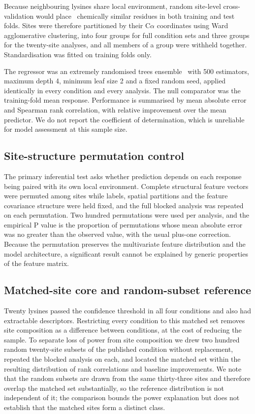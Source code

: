 \documentclass[journal=jprobs,manuscript=article,layout=traditional]{achemso}
\begin{document}
Because neighbouring lysines share local environment, random site-level cross-validation would place~\cite{roberts2017} chemically similar residues in both training and test folds. Sites were therefore partitioned by their C$\alpha$ coordinates using Ward agglomerative clustering, into four groups for full condition sets and three groups for the twenty-site analyses, and all members of a group were withheld together. Standardisation was fitted on training folds only.

The regressor was an extremely randomised trees ensemble~\cite{geurts2006} with 500 estimators, maximum depth 4, minimum leaf size 2 and a fixed random seed, applied identically in every condition and every analysis. The null comparator was the training-fold mean response. Performance is summarised by mean absolute error and Spearman rank correlation, with relative improvement over the mean predictor. We do not report the coefficient of determination, which is unreliable for model assessment at this sample size.

\subsection{Site-structure permutation control}

The primary inferential test asks whether prediction depends on each response being paired with its own local environment. Complete structural feature vectors were permuted among sites while labels, spatial partitions and the feature covariance structure were held fixed, and the full blocked analysis was repeated on each permutation. Two hundred permutations were used per analysis, and the empirical P value is the proportion of permutations whose mean absolute error was no greater than the observed value, with the usual plus-one correction. Because the permutation preserves the multivariate feature distribution and the model architecture, a significant result cannot be explained by generic properties of the feature matrix.

\subsection{Matched-site core and random-subset reference}

Twenty lysines passed the confidence threshold in all four conditions and also had extractable descriptors. Restricting every condition to this matched set removes site composition as a difference between conditions, at the cost of reducing the sample. To separate loss of power from site composition we drew two hundred random twenty-site subsets of the published condition without replacement, repeated the blocked analysis on each, and located the matched set within the resulting distribution of rank correlations and baseline improvements. We note that the random subsets are drawn from the same thirty-three sites and therefore overlap the matched set substantially, so the reference distribution is not independent of it; the comparison bounds the power explanation but does not establish that the matched sites form a distinct class.
\end{document}
